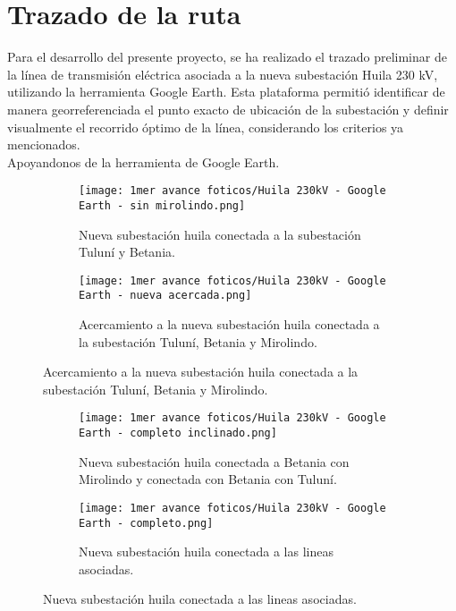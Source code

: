\section{Trazado de la ruta}
Para el desarrollo del presente proyecto, se ha realizado el trazado preliminar de la línea de transmisión eléctrica asociada a la nueva subestación Huila 230 kV, utilizando la herramienta Google Earth. Esta plataforma permitió identificar de manera georreferenciada el punto exacto de ubicación de la subestación y definir visualmente el recorrido óptimo de la línea, considerando los criterios ya mencionados. \\
Apoyandonos de la herramienta de Google Earth.


    \begin{figure}[h!] %
        \hfill %
        \begin{subfigure}{0.5\textwidth}
            \texttt{[image: 1mer avance foticos/Huila 230kV - Google Earth - sin mirolindo.png]}
            \caption{Nueva subestación huila conectada a la subestación Tuluní y Betania.} %
            \label{fig:sin mirolindo} %
        \end{subfigure}
        \begin{subfigure}{0.5\textwidth}
            \texttt{[image: 1mer avance foticos/Huila 230kV - Google Earth - nueva acercada.png]}
            \caption{Acercamiento a la nueva subestación huila conectada a la subestación Tuluní, Betania y Mirolindo.} %
            \label{fig:nueva acercada} %
        \end{subfigure}
    \end{figure}

    \begin{figure}[h!] %
        \begin{subfigure}{0.5\textwidth}
            \texttt{[image: 1mer avance foticos/Huila 230kV - Google Earth - completo inclinado.png]}
            \caption{Nueva subestación huila conectada a Betania con Mirolindo y conectada con Betania con Tuluní.} %
            \label{fig:todo angulo} %
        \end{subfigure}
        \hfill %
        \begin{subfigure}{0.5\textwidth}
            \texttt{[image: 1mer avance foticos/Huila 230kV - Google Earth - completo.png]}
            \caption{Nueva subestación huila conectada a las lineas asociadas.} %
            \label{fig:todo} %
        \end{subfigure}
    \end{figure}

    \newpage